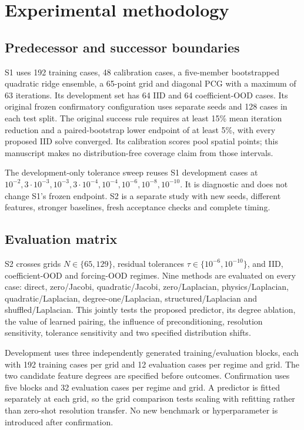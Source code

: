 \section{Experimental methodology}
\subsection{Predecessor and successor boundaries}
S1 uses 192 training cases, 48 calibration cases, a five-member bootstrapped quadratic ridge ensemble, a 65-point grid and diagonal PCG with a maximum of 63 iterations. Its development set has 64 IID and 64 coefficient-OOD cases. Its original frozen confirmatory configuration uses separate seeds and 128 cases in each test split. The original success rule requires at least 15\% mean iteration reduction and a paired-bootstrap lower endpoint of at least 5\%, with every proposed IID solve converged. Its calibration scores pool spatial points; this manuscript makes no distribution-free coverage claim from those intervals.

The development-only tolerance sweep reuses S1 development cases at $10^{-2},3\cdot10^{-3},10^{-3},3\cdot10^{-4},10^{-4},10^{-6},10^{-8},10^{-10}$. It is diagnostic and does not change S1's frozen endpoint. S2 is a separate study with new seeds, different features, stronger baselines, fresh acceptance checks and complete timing.

\subsection{Evaluation matrix}
S2 crosses grids $N\in\{65,129\}$, residual tolerances $\tau\in\{10^{-6},10^{-10}\}$, and IID, coefficient-OOD and forcing-OOD regimes. Nine methods are evaluated on every case: direct, zero/Jacobi, quadratic/Jacobi, zero/Laplacian, physics/Laplacian, quadratic/Laplacian, degree-one/Laplacian, structured/Laplacian and shuffled/Laplacian. This jointly tests the proposed predictor, its degree ablation, the value of learned pairing, the influence of preconditioning, resolution sensitivity, tolerance sensitivity and two specified distribution shifts.

Development uses three independently generated training/evaluation blocks, each with 192 training cases per grid and 12 evaluation cases per regime and grid. The two candidate feature degrees are specified before outcomes. Confirmation uses five blocks and 32 evaluation cases per regime and grid. A predictor is fitted separately at each grid, so the grid comparison tests scaling with refitting rather than zero-shot resolution transfer. No new benchmark or hyperparameter is introduced after confirmation.

